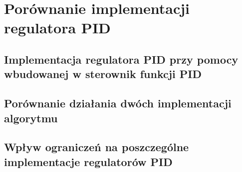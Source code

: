 \chapter{Porównanie implementacji regulatora PID}
\label{inteco_porownanie}

\section{Implementacja regulatora PID przy pomocy wbudowanej w sterownik funkcji PID}
\label{inteco_pid_plc}

\section{Porównanie działania dwóch implementacji algorytmu}
\label{inteco_pid_porownanie}

\section{Wpływ ograniczeń na poszczególne implementacje regulatorów PID}
\label{inteco_pid_ograniczenia}

